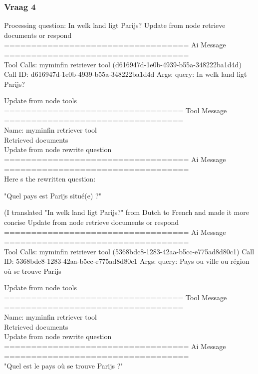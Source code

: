 \subsubsection{Vraag 4}
Processing question: In welk land ligt Parijs?
Update from node retrieve documents or respond
\\[1em]
================================== Ai Message ==================================
\\[1em]
Tool Calls:
myminfin retriever tool (d616947d-1e0b-4939-b55a-348222ba1d4d)
Call ID: d616947d-1e0b-4939-b55a-348222ba1d4d
Args:
query: In welk land ligt Parijs?

Update from node tools
\\[1em]
================================= Tool Message =================================
\\[1em]
Name: myminfin retriever tool
\\[1em]
Retrieved documents
\\[1em]

Update from node rewrite question
\\[1em]
================================== Ai Message ==================================
\\[1em]
Here s the rewritten question:

"Quel pays est Parijs situé(e) ?"

(I translated "In welk land ligt Parijs?" from Dutch to French and made it more concise
Update from node retrieve documents or respond
\\[1em]
================================== Ai Message ==================================
\\[1em]
Tool Calls:
myminfin retriever tool (5368bdc8-1283-42aa-b5cc-e775ad8d80c1)
Call ID: 5368bdc8-1283-42aa-b5cc-e775ad8d80c1
Args:
query: Pays ou ville ou région où se trouve Parijs

Update from node tools
\\[1em]
================================= Tool Message =================================
\\[1em]
Name: myminfin retriever tool
\\[1em]
Retrieved documents
\\[1em]

Update from node rewrite question
\\[1em]
================================== Ai Message ==================================
\\[1em]
"Quel est le pays où se trouve Parijs ?"


